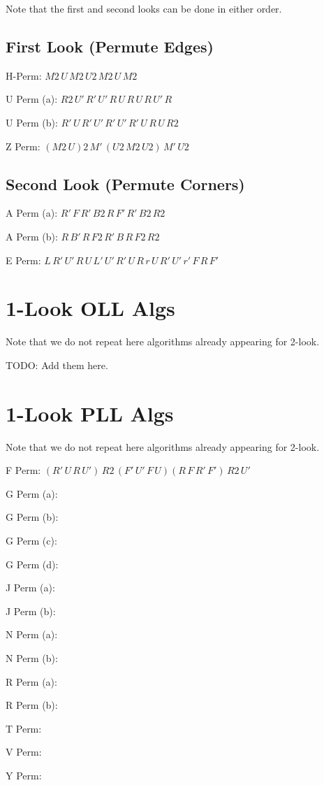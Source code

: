 \documentclass[12pt]{article}
\begin{document}
Note that the first and second looks can be done in either order.

\subsection*{First Look (Permute Edges)}

H-Perm: $M2\,U\,M2\,U2\,M2\,U\,M2$

\noindent
U Perm (a): $R2\,U'\,R'\,U'\,R\,U\,R\,U\,R\,U'\,R$

\noindent
U Perm (b): $R'\,U\,R'\,U'\,R'\,U'\,R'\,U\,R\,U\,R2$

\noindent
Z Perm: $(M2\,U)2\,M'\,(U2\,M2\,U2)\,M'\,U2$

\subsection*{Second Look (Permute Corners)}

\noindent
A Perm (a): $R'\,F\,R'\,B2\,R\,F'\,R'\,B2\,R2$

\noindent
A Perm (b): $R\,B'\,R\,F2\,R'\,B\,R\,F2\,R2$

\noindent
E Perm: $L\,R'\,U'\,R\,U\,L'\,U'\,R'\,U\,R\,r\,U\,R'\,U'\,r'\,F\,R\,F'$

\section*{1-Look OLL Algs}

Note that we do not repeat here algorithms already appearing for 2-look.
\linebreak

TODO: Add them here.

\section*{1-Look PLL Algs}

Note that we do not repeat here algorithms already appearing for 2-look.
\linebreak

\noindent
F Perm: $(R'\,U\,R\,U')\,R2\,(F'\,U'\,F\,U)(R\,F\,R'\,F')\,R2\,U'$

\noindent
G Perm (a):

\noindent
G Perm (b):

\noindent
G Perm (c):

\noindent
G Perm (d):

\noindent
J Perm (a):

\noindent
J Perm (b):

\noindent
N Perm (a):

\noindent
N Perm (b):

\noindent
R Perm (a):

\noindent
R Perm (b):

\noindent
T Perm:

\noindent
V Perm:

\noindent
Y Perm:
\end{document}
